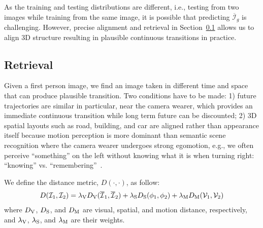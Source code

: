 \documentclass[10pt,twocolumn,letterpaper]{article}
\begin{document}
As the training and testing distributions are different, i.e., testing from two images while training from the same image, it is possible that predicting $\overline{\mathcal{I}}_g$ is challenging. However, precise alignment and retrieval in Section~\ref{Sec:ret} allows us to align 3D structure resulting in plausible continuous transitions in practice.





\subsection{Retrieval} \label{Sec:ret}
Given a first person image, we find an image taken in different time and space that can produce plausible transition. Two conditions have to be made: 1) future trajectories are similar in particular, near the camera wearer, which provides an immediate continuous transition while long term future can be discounted; 2) 3D spatial layouts such as road, building, and car are aligned rather than appearance itself because motion perception is more dominant than semantic scene recognition where the camera wearer undergoes strong egomotion, e.g., we often perceive ``something'' on the left without knowing what it is when turning right: ``knowing'' vs. ``remembering''~\cite{tulving:1983}.   

We define the distance metric, $D(\cdot,\cdot)$, as follow:
\begin{align}
    D(\mathcal{I}_1, \mathcal{I}_2) = \lambda_{\rm V}D_{\rm V}(\overline{\mathcal{I}}_1, \overline{\mathcal{I}}_2) + \lambda_{\rm S}D_{\rm S}(\phi_1, \phi_2)+ \lambda_{\rm M}D_{\rm M}(\mathcal{V}_1,\mathcal{V}_2) \nonumber
\end{align}
where $D_{\rm V}$, $D_{\rm S}$, and $D_{\rm M}$ are visual, spatial, and motion distance, respectively, and $\lambda_{\rm V}$, $\lambda_{\rm S}$, and $\lambda_{\rm M}$ are their weights. 
\end{document}
